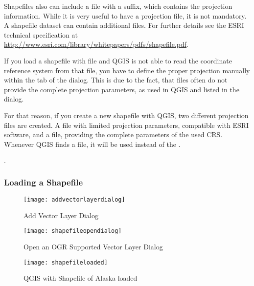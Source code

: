 Shapefiles also can include a file with a  suffix, which contains
the projection information. While it is very useful to have a projection file, it is not mandatory. A shapefile dataset can contain additional files. For further details see the ESRI technical specification at \url{http://www.esri.com/library/whitepapers/pdfs/shapefile.pdf}.


If you load a shapefile with  file and QGIS is not 
able to read the coordinate reference system from that file, you have to define the 
proper projection manually within the  tab of the  dialog. This is due to the fact, that  files often  
do not provide the complete projection parameters, as used in QGIS and listed in 
the  dialog. 

For that reason, if you create a new shapefile with QGIS, two different projection 
files are created. A  file with limited projection parameters, 
compatible with ESRI software, and a  file, providing the complete 
parameters of the used CRS. Whenever QGIS finds a  file, it will be 
used instead of the .   

.

\subsubsection{Loading a Shapefile}\label{sec:load_shapefile}

\begin{figure}[ht]
   \begin{center}
   \caption{Add Vector Layer Dialog \nixcaption}\label{fig:addvectorlayer}\smallskip
   \texttt{[image: addvectorlayerdialog]}
\end{center} 
\end{figure}

\begin{figure}[ht]
   \begin{center}
   \caption{Open an OGR Supported Vector Layer Dialog \nixcaption}\label{fig:openshapefile}\smallskip
   \texttt{[image: shapefileopendialog]}
\end{center} 
\end{figure}

\begin{figure}[ht]
   \begin{center}
   \caption{QGIS with Shapefile of Alaska loaded \nixcaption}\label{fig:loadedshapefile}\smallskip
   \texttt{[image: shapefileloaded]}
\end{center} 
\end{figure}

